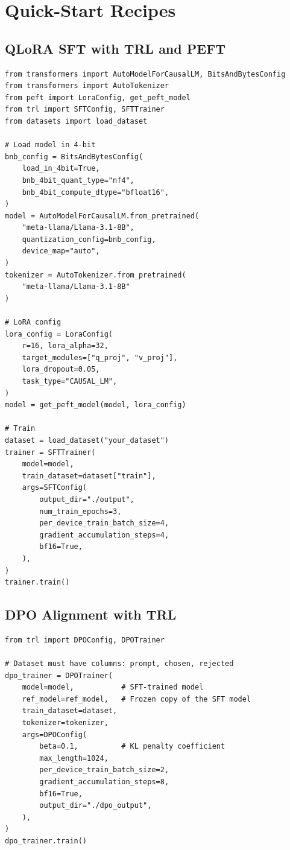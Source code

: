 \chapter{Quick-Start Recipes}

\section{QLoRA SFT with TRL and PEFT}

\begin{lstlisting}[style=pythonstyle, caption={Minimal QLoRA supervised fine-tuning with TRL}]
from transformers import AutoModelForCausalLM, BitsAndBytesConfig
from transformers import AutoTokenizer
from peft import LoraConfig, get_peft_model
from trl import SFTConfig, SFTTrainer
from datasets import load_dataset

# Load model in 4-bit
bnb_config = BitsAndBytesConfig(
    load_in_4bit=True,
    bnb_4bit_quant_type="nf4",
    bnb_4bit_compute_dtype="bfloat16",
)
model = AutoModelForCausalLM.from_pretrained(
    "meta-llama/Llama-3.1-8B",
    quantization_config=bnb_config,
    device_map="auto",
)
tokenizer = AutoTokenizer.from_pretrained(
    "meta-llama/Llama-3.1-8B"
)

# LoRA config
lora_config = LoraConfig(
    r=16, lora_alpha=32,
    target_modules=["q_proj", "v_proj"],
    lora_dropout=0.05,
    task_type="CAUSAL_LM",
)
model = get_peft_model(model, lora_config)

# Train
dataset = load_dataset("your_dataset")
trainer = SFTTrainer(
    model=model,
    train_dataset=dataset["train"],
    args=SFTConfig(
        output_dir="./output",
        num_train_epochs=3,
        per_device_train_batch_size=4,
        gradient_accumulation_steps=4,
        bf16=True,
    ),
)
trainer.train()
\end{lstlisting}

\section{DPO Alignment with TRL}

\begin{lstlisting}[style=pythonstyle, caption={DPO preference alignment with TRL}]
from trl import DPOConfig, DPOTrainer

# Dataset must have columns: prompt, chosen, rejected
dpo_trainer = DPOTrainer(
    model=model,           # SFT-trained model
    ref_model=ref_model,   # Frozen copy of the SFT model
    train_dataset=dataset,
    tokenizer=tokenizer,
    args=DPOConfig(
        beta=0.1,          # KL penalty coefficient
        max_length=1024,
        per_device_train_batch_size=2,
        gradient_accumulation_steps=8,
        bf16=True,
        output_dir="./dpo_output",
    ),
)
dpo_trainer.train()
\end{lstlisting}


